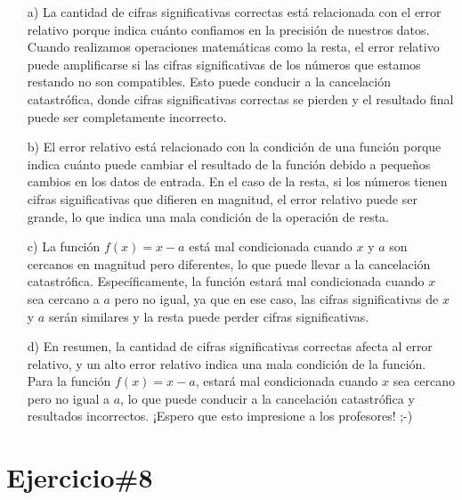 \documentclass[a4paper,12pt]{article}
\begin{document}
\begin{itemize}
    \item[a)]La cantidad de cifras significativas correctas está relacionada con el error relativo porque indica 
cuánto confiamos en la precisión de nuestros datos. Cuando realizamos operaciones matemáticas como la resta, el error 
relativo puede amplificarse si las cifras significativas de los números que estamos restando no son compatibles. 
Esto puede conducir a la cancelación catastrófica, donde cifras significativas correctas se pierden y el resultado 
final puede ser completamente incorrecto.
    \item[b)]El error relativo está relacionado con la condición de una función porque indica cuánto puede cambiar
el resultado de la función debido a pequeños cambios en los datos de entrada. En el caso de la resta, si los números 
tienen cifras significativas que difieren en magnitud, el error relativo puede ser grande, lo que indica una mala condición 
de la operación de resta.
    \item[c)]La función \( f(x) = x - a \) está mal condicionada cuando \( x \) y \( a \) son cercanos en magnitud pero diferentes, 
lo que puede llevar a la cancelación catastrófica. Específicamente, la función estará mal condicionada cuando \( x \) sea cercano a \( a \) 
pero no igual, ya que en ese caso, las cifras significativas de \( x \) y \( a \) serán similares y la resta puede perder cifras significativas.
    \item[d)]En resumen, la cantidad de cifras significativas correctas afecta al error relativo, y un alto error relativo indica una mala condición 
de la función. Para la función \( f(x) = x - a \), estará mal condicionada cuando \( x \) sea cercano pero no igual a \( a \), lo que puede conducir a 
la cancelación catastrófica y resultados incorrectos. 
¡Espero que esto impresione a los profesores! ;-)

\end{itemize}

\section*{Ejercicio\#8}
\end{document}
